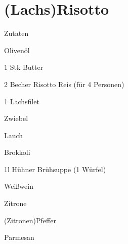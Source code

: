 \chapter*{(Lachs)Risotto}
\begin{multicols}{2}
 {\Large Zutaten}
 \begin{Zutaten}
		\item Olivenöl
		\item 1 Stk Butter
		\item 2 Becher Risotto Reis (für 4 Personen)
		\item 1 Lachsfilet
		\item Zwiebel
		\item Lauch
		\item Brokkoli
		\item 1l Hühner Brühsuppe (1 Würfel)
		\item Weißwein
		\item Zitrone
		\item (Zitronen)Pfeffer
		\item Parmesan
		
		
		
		
		
\end{Zutaten}
\columnbreak
\end{multicols}


